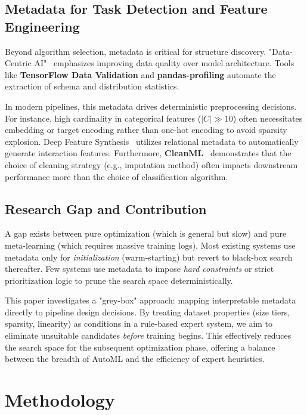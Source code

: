 \documentclass[conference]{IEEEtran}
\begin{document}
   \subsection{Metadata for Task Detection and Feature Engineering}

   Beyond algorithm selection, metadata is critical for structure discovery. "Data-Centric AI"~\cite{sambasivan2021data} emphasizes improving data quality over model architecture. Tools like \textbf{TensorFlow Data Validation} and \textbf{pandas-profiling} automate the extraction of schema and distribution statistics.

   In modern pipelines, this metadata drives deterministic preprocessing decisions. For instance, high cardinality in categorical features ($|C| \gg 10$) often necessitates embedding or target encoding rather than one-hot encoding to avoid sparsity explosion. Deep Feature Synthesis~\cite{kanter2015deep} utilizes relational metadata to automatically generate interaction features. Furthermore, \textbf{CleanML}~\cite{li2021cleanml} demonstrates that the choice of cleaning strategy (e.g., imputation method) often impacts downstream performance more than the choice of classification algorithm.

   \subsection{Research Gap and Contribution}

   A gap exists between pure optimization (which is general but slow) and pure meta-learning (which requires massive training logs). Most existing systems use metadata only for \emph{initialization} (warm-starting) but revert to black-box search thereafter. Few systems use metadata to impose \emph{hard constraints} or strict prioritization logic to prune the search space deterministically.

   This paper investigates a "grey-box" approach: mapping interpretable metadata directly to pipeline design decisions. By treating dataset properties (size tiers, sparsity, linearity) as conditions in a rule-based expert system, we aim to eliminate unsuitable candidates \emph{before} training begins. This effectively reduces the search space for the subsequent optimization phase, offering a balance between the breadth of AutoML and the efficiency of expert heuristics.

   \section{Methodology}
   \label{sec:methodology}
\end{document}
